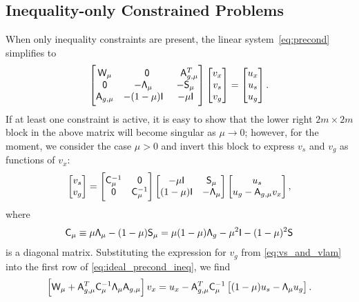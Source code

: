 \subsection{Inequality-only Constrained Problems}
When only inequality constraints are present, the  linear system~\eqref{eq:precond} 
simplifies to 
\begin{equation}\label{eq:ideal_precond_ineq}
  \begin{bmatrix} 
	\mathsf{W}_\mu & \phantom{-}\mathsf{0} &  \phantom{-}\mathsf{A}_{g,\mu}^T \\
	\mathsf{0}  & -\mathsf{\Lambda}_\mu & -\mathsf{S}_\mu \\
	\mathsf{A}_{g,\mu} &  -(1-\mu)\mathsf{I} & -\mu \mathsf{I}
\end{bmatrix}
\begin{bmatrix} v_x \\ v_s \\ v_g \end{bmatrix} 
= 
\begin{bmatrix} u_x \\ u_s \\ u_g \end{bmatrix}.
\end{equation}
If at least one constraint is active, it is easy to show that
the lower right $2m \times 2m$ block in the above matrix will become singular as
$\mu \rightarrow 0$; however, for the moment, we consider the case $\mu > 0$ and
invert this block to express $v_s$ and $v_g$ as functions of $v_x$:
\begin{equation}\label{eq:vs_and_vlam}
  \begin{bmatrix} v_s \\ v_g \end{bmatrix}
  =
  \begin{bmatrix}
    \mathsf{C}_\mu^{-1} & \mathsf{0} \\
    \mathsf{0} & \mathsf{C}_\mu^{-1}
  \end{bmatrix}
  \begin{bmatrix}
    -\mu \mathsf{I} & \mathsf{S}_\mu \\
    (1-\mu)\mathsf{I} & -\mathsf{\Lambda}_\mu 
  \end{bmatrix}
  \begin{bmatrix} u_s \\ u_g - \mathsf{A}_{g, \mu} v_x \end{bmatrix},
\end{equation}
where 
\begin{equation*}
  \mathsf{C}_{\mu} \equiv \mu \mathsf{\Lambda}_\mu - (1-\mu) \mathsf{S}_\mu
  = \mu (1-\mu) \mathsf{\Lambda}_g - \mu^2 \mathsf{I}- (1-\mu)^2 \mathsf{S}
\end{equation*}
is a diagonal matrix.  Substituting the expression for $v_g$ from
\eqref{eq:vs_and_vlam} into the first row of \eqref{eq:ideal_precond_ineq}, we find
\begin{equation}\label{eq:schur}
\left[\mathsf{W}_\mu + \mathsf{A}_{g, \mu}^T \mathsf{C}_\mu^{-1} \mathsf{\Lambda}_\mu \mathsf{A}_{g,\mu}
  \right] v_x = u_x - \mathsf{A}_{g,\mu}^T \mathsf{C}_{\mu}^{-1} \left[(1-\mu) u_s -
  \mathsf{\Lambda}_\mu u_g \right].
\end{equation}

